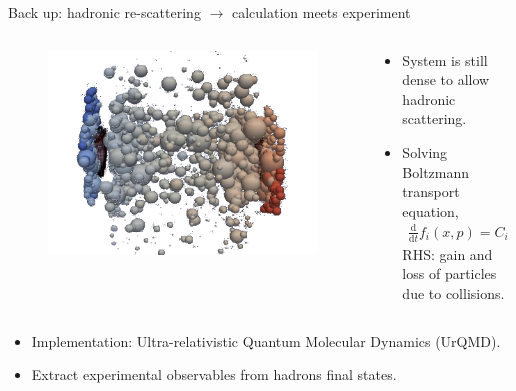 \documentclass[11pt]{beamer}
\begin{document}
\begin{frame}[noframenumbering]{Back up: hadronic re-scattering $\rightarrow$ calculation meets experiment}
\begin{columns}
 \begin{column}{0.2\textwidth}
    \begin{figure}
   	\begin{center}
   	\includegraphics[width=\textwidth]{pics/new300.png}
	\end{center} 	
  	\end{figure}
  \end{column}
  \begin{column}{0.8\textwidth}
  \begin{itemize}
  	\item System is still dense to allow hadronic scattering.
	\item Solving Boltzmann transport equation, 
		\begin{eqnarray}
		\frac{\mathrm{d}}{\mathrm{d}t}f_i(x, p) = C_i(x, p).
		\end{eqnarray}
		 RHS: gain and loss of particles due to collisions.
  \end{itemize}
  \end{column}
\end{columns}
\begin{columns}
 \begin{column}{0.6\textwidth}
  \begin{itemize}
  	\item Implementation: Ultra-relativistic Quantum Molecular Dynamics (UrQMD). 
  	\item Extract experimental observables from hadrons final states.

\end{itemize}
\end{column}
\end{columns}
\end{frame}
\end{document}
